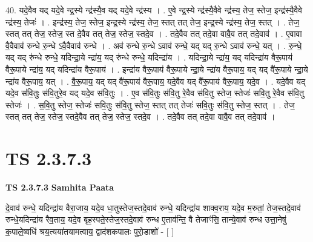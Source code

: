 \documentclass[17pt]{extarticle}
\begin{document}
40. यदे॒वैव यद् यदे॒वे न्द्र॒स्ये न्द्र॑स्यै॒व यद् यदे॒वे न्द्र॑स्य । . ए॒वे न्द्र॒स्ये न्द्र॑स्यै॒वैवे न्द्र॑स्य॒ तेज॒ स्तेज॒ इन्द्र॑स्यै॒वैवे न्द्र॑स्य॒ तेजः॑ । . इन्द्र॑स्य॒ तेज॒ स्तेज॒ इन्द्र॒स्ये न्द्र॑स्य॒ तेज॒ स्तत् तत् तेज॒ इन्द्र॒स्ये न्द्र॑स्य॒ तेज॒ स्तत् । . तेज॒ स्तत् तत् तेज॒ स्तेज॒ स्त दे॒वैव तत् तेज॒ स्तेज॒ स्तदे॒व । . तदे॒वैव तत् तदे॒वा वावै॒व तत् तदे॒वाव॑ । . ए॒वावा वै॒वैवाव॑ रुन्धे रु॒न्धे ऽवै॒वैवाव॑ रुन्धे । . अव॑ रुन्धे रु॒न्धे ऽवाव॑ रुन्धे॒ यद् यद् रु॒न्धे ऽवाव॑ रुन्धे॒ यत् । . रु॒न्धे॒ यद् यद् रु॑न्धे रुन्धे॒ यदिन्द्रा॒ये न्द्रा॑य॒ यद् रु॑न्धे रुन्धे॒ यदिन्द्रा॑य । . यदिन्द्रा॒ये न्द्रा॑य॒ यद् यदिन्द्रा॑य वैरू॒पाय॑ वैरू॒पाये न्द्रा॑य॒ यद् यदिन्द्रा॑य वैरू॒पाय॑ । . इन्द्रा॑य वैरू॒पाय॑ वैरू॒पाये न्द्रा॒ये न्द्रा॑य वैरू॒पाय॒ यद् यद् वै॑रू॒पाये न्द्रा॒ये न्द्रा॑य वैरू॒पाय॒ यत् । . वै॒रू॒पाय॒ यद् यद् वै॑रू॒पाय॑ वैरू॒पाय॒ यदे॒वैव यद् वै॑रू॒पाय॑ वैरू॒पाय॒ यदे॒व । . यदे॒वैव यद् यदे॒व स॑वि॒तुः स॑वि॒तुरे॒व यद् यदे॒व स॑वि॒तुः । . ए॒व स॑वि॒तुः स॑वि॒तु रे॒वैव स॑वि॒तु स्तेज॒ स्तेजः॑ सवि॒तु रे॒वैव स॑वि॒तु स्तेजः॑ । . स॒वि॒तु स्तेज॒ स्तेजः॑ सवि॒तुः स॑वि॒तु स्तेज॒ स्तत् तत् तेजः॑ सवि॒तुः स॑वि॒तु स्तेज॒ स्तत् । . तेज॒ स्तत् तत् तेज॒ स्तेज॒ स्तदे॒वैव तत् तेज॒ स्तेज॒ स्तदे॒व । . तदे॒वैव तत् तदे॒वा वावै॒व तत् तदे॒वाव॑ । \newline
\pagebreak
{}

\section{ TS 2.3.7.3 }

\textbf{TS 2.3.7.3 } \newline
\textbf{Samhita Paata} \newline

दे॒वाव॑ रुन्धे॒ यदिन्द्रा॑य वैरा॒जाय॒ यदे॒व धा॒तुस्तेज॒स्तदे॒वाव॑ रुन्धे॒ यदिन्द्रा॑य शाक्व॒राय॒ यदे॒व म॒रुतां॒ तेज॒स्तदे॒वाव॑ रुन्धे॒यदिन्द्रा॑य रैव॒ताय॒ यदे॒व बृह॒स्पते॒स्तेज॒स्तदे॒वाव॑ रुन्ध ए॒ताव॑न्ति॒ वै तेजाꣳ॑सि॒ तान्ये॒वाव॑ रुन्ध उत्ता॒नेषु॑ क॒पाले॒ष्वधि॑ श्रय॒त्यया॑तयामत्वाय॒ द्वाद॑शकपालः पुरो॒डाशो॑ - [  ] \newline
\end{document}
